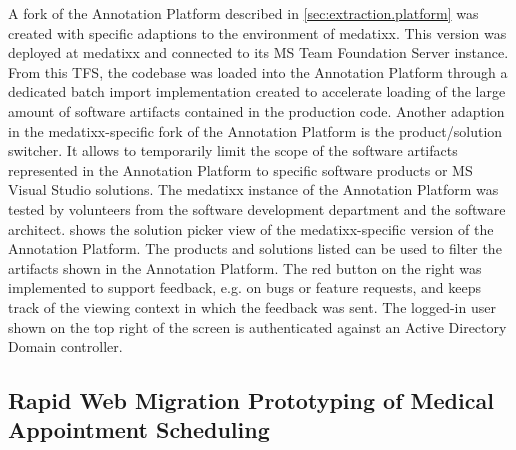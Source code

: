 A fork of the Annotation Platform described in \cref{sec:extraction.platform} was created with specific adaptions to the environment of medatixx.
This version was deployed at medatixx and connected to its MS Team Foundation Server instance.
From this TFS, the codebase was loaded into the Annotation Platform through a dedicated batch import implementation created to accelerate loading of the large amount of software \glspl{artifact} contained in the production code.
Another adaption in the medatixx-specific fork of the Annotation Platform is the product/solution switcher.
It allows to temporarily limit the scope of the software \glspl{artifact} represented in the Annotation Platform to specific software products or MS Visual Studio solutions.
The medatixx instance of the Annotation Platform was tested by volunteers from the software development department and the software architect.
 shows the solution picker view of the medatixx-specific version of the Annotation Platform.
The products and solutions listed can be used to filter the \glspl{artifact} shown in the Annotation Platform.
The red button on the right was implemented to support feedback, e.g. on bugs or feature requests, and keeps track of the viewing context in which the feedback was sent.
The logged-in user shown on the top right of the screen is authenticated against an Active Directory Domain controller.

\vspace{-10pt}
\subsection[Rapid Web Migration Prototyping of Medical \\ Appointment Scheduling]{Rapid Web Migration Prototyping of Medical Appointment Scheduling}
\vspace{10pt}

